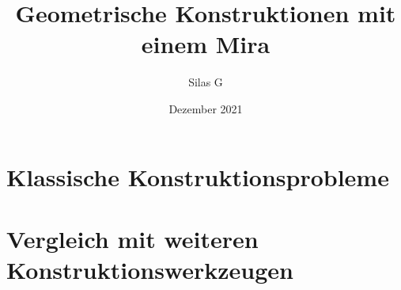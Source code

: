 \documentclass{scrbook}
\begin{document}
\frontmatter
\begin{titlepage}
    \title{Geometrische Konstruktionen mit einem Mira}
    \author{Silas G}
    \date{Dezember 2021}
    \maketitle
\end{titlepage}
\tableofcontents

\mainmatter



\chapter{Klassische Konstruktionsprobleme}
\chapter{Vergleich mit weiteren Konstruktionswerkzeugen}

 
\backmatter


\listoffigures
\end{document}
